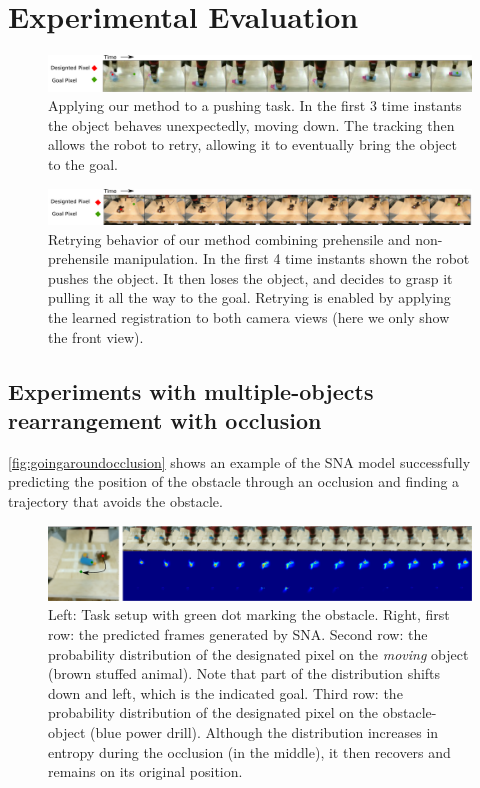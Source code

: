 \section{Experimental Evaluation}

\begin{figure}
    \centering    \includegraphics[width=1.0\textwidth]{images_rfr/push_correction.pdf}
    \caption{\small{Applying our method to a pushing task. In the first 3 time instants the object behaves unexpectedly, moving down. The tracking then allows the robot to retry, allowing it to eventually bring the object to the goal.}}
    \label{fig:push_retry}
\end{figure}

\begin{figure}
	\centering
	\includegraphics[width=1.0\textwidth]{images_rfr/pick_place_plush.pdf}
	\caption{\small{Retrying behavior of our method combining prehensile and non-prehensile manipulation. In the first 4 time instants shown the robot pushes the object. It then loses the object, and decides to grasp it pulling it all the way to the goal. Retrying is enabled by applying the learned registration to both camera views (here we only show the front view).}}
	\label{fig:push_grasp}
\end{figure}

\subsection{Experiments with multiple-objects rearrangement with occlusion}

\autoref{fig:goingaroundocclusion} shows an example of the SNA model successfully predicting the position of the obstacle through an occlusion and finding a trajectory that avoids the obstacle. 

\begin{figure}
	\centering
	\includegraphics[width=1\linewidth]{images_sna/multiobject_qualitative/avoid_obstacle.pdf}
	\caption{Left: Task setup with green dot marking the obstacle. Right, first row: the predicted frames generated by SNA. Second row: the probability distribution of the designated pixel on the \textit{moving} object (brown stuffed animal). Note that part of the distribution shifts down and left, which is the indicated goal. Third row: the probability distribution of the designated pixel on the obstacle-object (blue power drill). Although the distribution increases in entropy during the occlusion (in the middle), it then recovers and remains on its original position.
		\label{fig:goingaroundocclusion}}
\end{figure}


